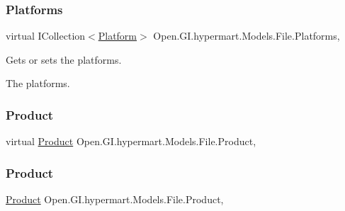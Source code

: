 \subsubsection{\texorpdfstring{Platforms}{Platforms}}
{\footnotesize\ttfamily virtual I\+Collection$<$\hyperlink{class_open_1_1_g_i_1_1hypermart_1_1_models_1_1_platform}{Platform}$>$ Open.\+G\+I.\+hypermart.\+Models.\+File.\+Platforms\hspace{0.3cm}{\ttfamily [get]}, {\ttfamily [set]}}



Gets or sets the platforms. 

The platforms. \hypertarget{class_open_1_1_g_i_1_1hypermart_1_1_models_1_1_file_a7a2d45936082be844aa8528b298a2d6a}{}\label{class_open_1_1_g_i_1_1hypermart_1_1_models_1_1_file_a7a2d45936082be844aa8528b298a2d6a} 
\subsubsection{\texorpdfstring{Product}{Product}\hspace{0.1cm}{\footnotesize\ttfamily [1/2]}}
{\footnotesize\ttfamily virtual \hyperlink{class_open_1_1_g_i_1_1hypermart_1_1_models_1_1_product}{Product} Open.\+G\+I.\+hypermart.\+Models.\+File.\+Product\hspace{0.3cm}{\ttfamily [get]}, {\ttfamily [set]}}

\hypertarget{class_open_1_1_g_i_1_1hypermart_1_1_models_1_1_file_a4b8d3f1af1802269e9e06285f9bf81b3}{}\label{class_open_1_1_g_i_1_1hypermart_1_1_models_1_1_file_a4b8d3f1af1802269e9e06285f9bf81b3} 
\subsubsection{\texorpdfstring{Product}{Product}\hspace{0.1cm}{\footnotesize\ttfamily [2/2]}}
{\footnotesize\ttfamily \hyperlink{class_open_1_1_g_i_1_1hypermart_1_1_models_1_1_product}{Product} Open.\+G\+I.\+hypermart.\+Models.\+File.\+Product\hspace{0.3cm}{\ttfamily [get]}, {\ttfamily [set]}}



